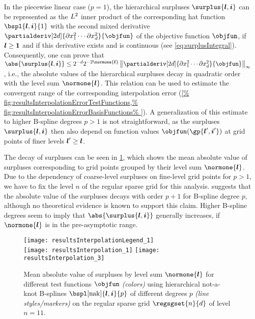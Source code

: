 In the piecewise linear case ($p = 1$),
the hierarchical surpluses $\surplus{\*l,\*i}$
can be represented as the $L^2$ inner product of
the corresponding hat function $\bspl{\*l,\*i}{1}$ with the
second mixed derivative
$\partialderiv[2d]{\partialdiff x_1^2 \dotsm \partialdiff x_d^2}{\objfun}$
of the objective function $\objfun$,
if ${\boldsymbol{l}} \ge {\boldsymbol{1}}$ and if this derivative exists and is continuous
(see \cref{eq:surplusIntegral}).
Consequently, one can prove that
$\abs{\surplus{\*l,\*i}} \le 2^{-d} 2^{-2\normone{\*l}}
\normscaled[\infty]{
  \partialderiv[2d]{\partialdiff x_1^2 \dotsm \partialdiff x_d^2}{\objfun}
}$ \cite{Bungartz04Sparse},
i.e., the absolute values of the hierarchical surpluses
decay  in quadratic order with the level sum $\normone{\*l}$.
This relation can be used to estimate the convergent range
of the corresponding interpolation error (\cref{%
  fig:resultsInterpolationErrorTestFunctions,%
  fig:resultsInterpolationErrorBasisFunctions%
}).
A generalization of this estimate to higher B-spline degrees $p > 1$
is not straightforward, as the surpluses $\surplus{\*l,\*i}$
then also depend on function values $\objfun(\gp{\*l',\*i'})$ at
grid points of finer levels ${\boldsymbol{l}}' \ge {\boldsymbol{l}}$.

The decay of surpluses can be seen in \cref{fig:resultsDecaySurpluses},
which shows the mean absolute value of surpluses corresponding to
grid points grouped by their level sum $\normone{\*l}$.
Due to the dependency of coarse-level surpluses on fine-level grid points
for $p > 1$,
we have to fix the level $n$ of the regular sparse grid for this analysis.
 suggests that the
absolute value of the surpluses decays with order $p + 1$ for
B-spline degree $p$, although no theoretical evidence
is known to support this claim.
Higher B-spline degrees seem to imply that
$\abs{\surplus{\*l,\*i}}$ generally increases, if $\normone{\*l}$ is
in the pre-asymptotic range.

\begin{figure}
  \texttt{[image: resultsInterpolationLegend\_1]}\\[2mm]%
  \texttt{[image: resultsInterpolation\_1]}%
  \hfill%
  \texttt{[image: resultsInterpolation\_3]}%
  \caption[Decay of surpluses for different test functions]{%
    Mean absolute value of surpluses by level sum $\normone{\*l}$
    for different test functions $\objfun$ \emph{(colors)}
    using hierarchical not-a-knot B-splines
    $\bspl[\nak]{\*l,\*i}{p}$ of different degrees $p$
    \emph{(line styles/markers)} on
    the regular sparse grid $\regsgset{n}{d}$ of level $n = 11$.%
  }%
  \label{fig:resultsDecaySurpluses}%
\end{figure}




